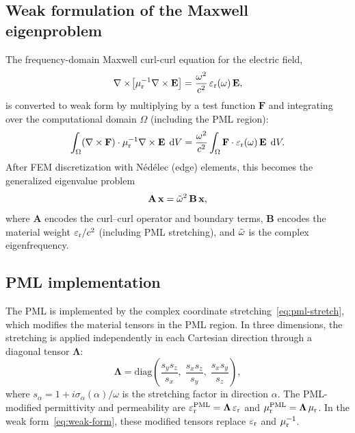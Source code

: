 \subsection{Weak formulation of the Maxwell eigenproblem}
\label{ssec:weak-form}

The frequency-domain Maxwell curl-curl equation for the electric field,
\begin{equation}
 \nabla\times\!\left[\mu_{\mathrm{r}}^{-1}\nabla\times\mathbf{E}\right]
 = \frac{\omega^2}{c^2}\,\varepsilon_{\mathrm{r}}(\omega)\,\mathbf{E},
 \label{eq:curl-curl-e}
\end{equation}
is converted to weak form by multiplying by a test function
$\mathbf{F}$ and integrating over the computational domain $\Omega$
(including the PML region):
\begin{equation}
 \int_\Omega (\nabla\times\mathbf{F})\cdot\mu_{\mathrm{r}}^{-1}\nabla\times\mathbf{E}\;\mathop{}\!\mathrm{d} V
 = \frac{\omega^2}{c^2}\int_\Omega
 \mathbf{F}\cdot\varepsilon_{\mathrm{r}}(\omega)\,\mathbf{E}\;\mathop{}\!\mathrm{d} V.
 \label{eq:weak-form}
\end{equation}
After FEM discretization with N\'ed\'elec (edge) elements, this becomes
the generalized eigenvalue problem
\begin{equation}
 \mathbf{A}\,\mathbf{x} = \tilde{\omega}^2\,\mathbf{B}\,\mathbf{x},
 \label{eq:fem-gep}
\end{equation}
where $\mathbf{A}$ encodes the curl--curl operator and boundary terms,
$\mathbf{B}$ encodes the material weight $\varepsilon_{\mathrm{r}}/c^2$ (including PML
stretching), and $\tilde{\omega}$ is the complex eigenfrequency.

\subsection{PML implementation}
\label{ssec:pml-implementation}

The PML is implemented by the complex coordinate
stretching~\eqref{eq:pml-stretch}, which modifies the material tensors
in the PML region. In three dimensions, the stretching is applied
independently in each Cartesian direction through a diagonal tensor
$\boldsymbol{\Lambda}$:
\begin{equation}
 \boldsymbol{\Lambda} = \mathrm{diag}
 \left(\frac{s_y s_z}{s_x},\;
 \frac{s_x s_z}{s_y},\;
 \frac{s_x s_y}{s_z}\right),
 \label{eq:pml-tensor}
\end{equation}
where $s_\alpha = 1 + i\sigma_\alpha(\alpha)/\omega$ is the stretching
factor in direction $\alpha$. The PML-modified permittivity and
permeability are
$\varepsilon_{\mathrm{r}}^{\mathrm{PML}} = \boldsymbol{\Lambda}\,\varepsilon_{\mathrm{r}}$ and
$\mu_{\mathrm{r}}^{\mathrm{PML}} = \boldsymbol{\Lambda}\,\mu_{\mathrm{r}}$. In the weak
form~\eqref{eq:weak-form}, these modified tensors replace $\varepsilon_{\mathrm{r}}$ and
$\mu_{\mathrm{r}}^{-1}$.


